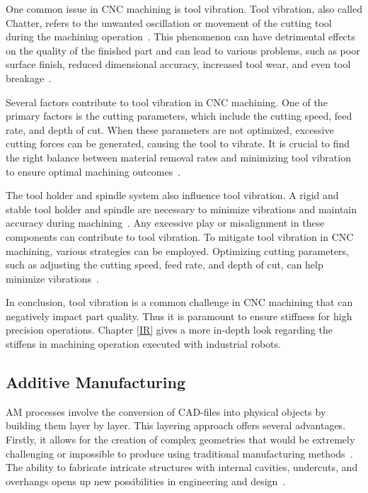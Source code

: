 One common issue in CNC machining is tool vibration. Tool vibration, also called Chatter, refers to the unwanted oscillation or movement of the cutting tool during the machining operation~\cite{YUE.2019}. This phenomenon can have detrimental effects on the quality of the finished part and can lead to various problems, such as poor surface finish, reduced dimensional accuracy, increased tool wear, and even tool breakage~\cite{Aslan.2018}.

Several factors contribute to tool vibration in CNC machining. One of the primary factors is the cutting parameters, which include the cutting speed, feed rate, and depth of cut. When these parameters are not optimized, excessive cutting forces can be generated, causing the tool to vibrate. It is crucial to find the right balance between material removal rates and minimizing tool vibration to ensure optimal machining outcomes~\cite{GiorgioBort.2016}.

The tool holder and spindle system also influence tool vibration. A rigid and stable tool holder and spindle are necessary to minimize vibrations and maintain accuracy during machining~\cite{Wan.2019}. Any excessive play or misalignment in these components can contribute to tool vibration. To mitigate tool vibration in CNC machining, various strategies can be employed. Optimizing cutting parameters, such as adjusting the cutting speed, feed rate, and depth of cut, can help minimize vibrations~\cite{Ong.2019}.

In conclusion, tool vibration is a common challenge in CNC machining that can negatively impact part quality. Thus it is paramount to ensure stiffness for high precision operations.
Chapter \ref{IR} gives a more in-depth look regarding the stiffens in machining operation executed with industrial robots.

\subsection{Additive Manufacturing}
AM processes involve the conversion of CAD-files into physical objects by building them layer by layer. This layering approach offers several advantages. Firstly, it allows for the creation of complex geometries that would be extremely challenging or impossible to produce using traditional manufacturing methods~\cite{Prakash.2018}. The ability to fabricate intricate structures with internal cavities, undercuts, and overhangs opens up new possibilities in engineering and design~\cite{Abdulhameed.2019}.

